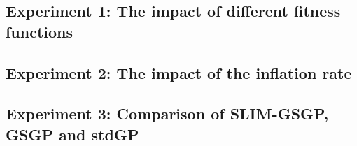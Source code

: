 \documentclass[manuscript, review, anonymous]{acmart} %
\begin{document}
\subsection{Experiment 1: The impact of different fitness functions}
\label{app:exp1}


\newpage

\newpage

\subsection{Experiment 2: The impact of the inflation rate}
\label{app:exp2}

\newpage

\newpage

\newpage

\newpage



\subsection{Experiment 3: Comparison of SLIM-GSGP, GSGP and stdGP}
\label{app:exp3}

\newpage

\newpage

\end{document}
